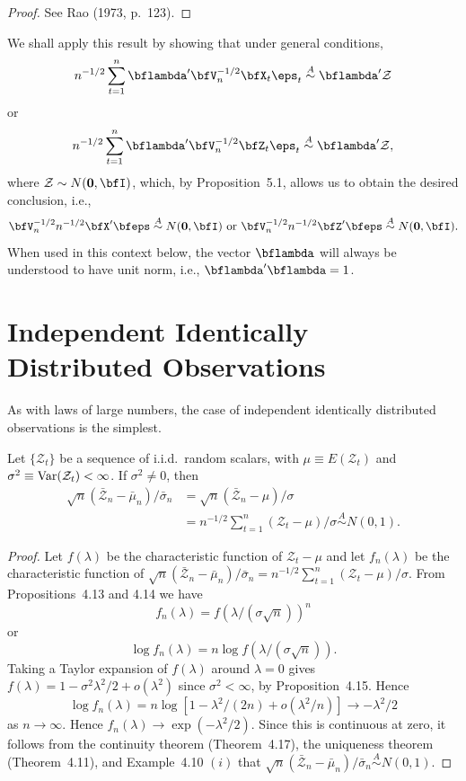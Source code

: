 \begin{proof}
See Rao (1973, p.~123).
\end{proof}

We shall apply this result by showing that under general conditions,
\[
n^{-1/2} \sum_{t=1}^{n} \bflambda' \bfV_n^{-1/2} \bfX_t \eps_t \overset{A}{\sim} \bflambda' \mathcal{Z}
\]
or
\[
n^{-1/2} \sum_{t=1}^{n} \bflambda' \bfV_n^{-1/2} \bfZ_t \eps_t \overset{A}{\sim} \bflambda' \mathcal{Z},
\]
where $\mathcal{Z} \sim N(\mathbf{0}, \bfI)$, which, by Proposition~5.1, allows us to obtain the desired conclusion, i.e.,
\[
\bfV_n^{-1/2} n^{-1/2} \bfX'\bfeps \overset{A}{\sim} N(\mathbf{0}, \bfI) \text{ or } \bfV_n^{-1/2} n^{-1/2} \bfZ'\bfeps \overset{A}{\sim} N(\mathbf{0}, \bfI).
\]
When used in this context below, the vector $\bflambda$ will always be understood to have unit norm, i.e., $\bflambda'\bflambda = 1$.

\section{Independent Identically Distributed Observations}\label{sec:clt-iid}

As with laws of large numbers, the case of independent identically distributed observations is the simplest.

\begin{theorem}[Lindeberg--L\'{e}vy]\label{thm:lindeberg-levy}
Let $\{\mathcal{Z}_t\}$ be a sequence of i.i.d.\ random scalars, with $\mu \equiv E(\mathcal{Z}_t)$ and $\sigma^2 \equiv \operatorname{Var}(\mathcal{Z}_t) < \infty$. If $\sigma^2 \neq 0$, then
\begin{align*}
\sqrt{n}(\bar{\mathcal{Z}}_n - \bar{\mu}_n)/\bar{\sigma}_n &= \sqrt{n}(\bar{\mathcal{Z}}_n - \mu)/\sigma \\
&= n^{-1/2} \sum_{t=1}^{n} (\mathcal{Z}_t - \mu)/\sigma \overset{A}{\sim} N(0,1).
\end{align*}
\end{theorem}

\begin{proof}
Let $f(\lambda)$ be the characteristic function of $\mathcal{Z}_t - \mu$ and let $f_n(\lambda)$ be the characteristic function of $\sqrt{n}(\bar{\mathcal{Z}}_n - \bar{\mu}_n)/\bar{\sigma}_n = n^{-1/2}\sum_{t=1}^{n}(\mathcal{Z}_t - \mu)/\sigma$. From Propositions~4.13 and 4.14 we have
\[
f_n(\lambda) = f(\lambda/(\sigma\sqrt{n}))^n
\]
or
\[
\log f_n(\lambda) = n \log f(\lambda/(\sigma\sqrt{n})).
\]
Taking a Taylor expansion of $f(\lambda)$ around $\lambda = 0$ gives $f(\lambda) = 1 - \sigma^2 \lambda^2/2 + o(\lambda^2)$ since $\sigma^2 < \infty$, by Proposition~4.15. Hence
\[
\log f_n(\lambda) = n \log[1 - \lambda^2/(2n) + o(\lambda^2/n)] \to -\lambda^2/2
\]
as $n \to \infty$. Hence $f_n(\lambda) \to \exp(-\lambda^2/2)$. Since this is continuous at zero, it follows from the continuity theorem (Theorem~4.17), the uniqueness theorem (Theorem~4.11), and Example~4.10 $(i)$ that $\sqrt{n}(\bar{\mathcal{Z}}_n - \bar{\mu}_n)/\bar{\sigma}_n \overset{A}{\sim} N(0,1)$.
\end{proof}

